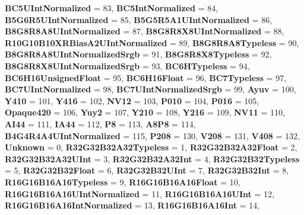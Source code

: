\begin{DoxyCompactItemize}
\newline
{\bfseries B\+C5\+U\+Int\+Normalized} = 83, 
{\bfseries B\+C5\+Int\+Normalized} = 84, 
{\bfseries B5\+G6\+R5\+U\+Int\+Normalized} = 85, 
{\bfseries B5\+G5\+R5\+A1\+U\+Int\+Normalized} = 86, 
\newline
{\bfseries B8\+G8\+R8\+A8\+U\+Int\+Normalized} = 87, 
{\bfseries B8\+G8\+R8\+X8\+U\+Int\+Normalized} = 88, 
{\bfseries R10\+G10\+B10\+X\+R\+Bias\+A2\+U\+Int\+Normalized} = 89, 
{\bfseries B8\+G8\+R8\+A8\+Typeless} = 90, 
\newline
{\bfseries B8\+G8\+R8\+A8\+U\+Int\+Normalized\+Srgb} = 91, 
{\bfseries B8\+G8\+R8\+X8\+Typeless} = 92, 
{\bfseries B8\+G8\+R8\+X8\+U\+Int\+Normalized\+Srgb} = 93, 
{\bfseries B\+C6\+H\+Typeless} = 94, 
\newline
{\bfseries B\+C6\+H16\+Unsigned\+Float} = 95, 
{\bfseries B\+C6\+H16\+Float} = 96, 
{\bfseries B\+C7\+Typeless} = 97, 
{\bfseries B\+C7\+U\+Int\+Normalized} = 98, 
\newline
{\bfseries B\+C7\+U\+Int\+Normalized\+Srgb} = 99, 
{\bfseries Ayuv} = 100, 
{\bfseries Y410} = 101, 
{\bfseries Y416} = 102, 
\newline
{\bfseries N\+V12} = 103, 
{\bfseries P010} = 104, 
{\bfseries P016} = 105, 
{\bfseries Opaque420} = 106, 
\newline
{\bfseries Yuy2} = 107, 
{\bfseries Y210} = 108, 
{\bfseries Y216} = 109, 
{\bfseries N\+V11} = 110, 
\newline
{\bfseries A\+I44} = 111, 
{\bfseries I\+A44} = 112, 
{\bfseries P8} = 113, 
{\bfseries A8\+P8} = 114, 
\newline
{\bfseries B4\+G4\+R4\+A4\+U\+Int\+Normalized} = 115, 
{\bfseries P208} = 130, 
{\bfseries V208} = 131, 
{\bfseries V408} = 132, 
\newline
{\bfseries Unknown} = 0, 
{\bfseries R32\+G32\+B32\+A32\+Typeless} = 1, 
{\bfseries R32\+G32\+B32\+A32\+Float} = 2, 
{\bfseries R32\+G32\+B32\+A32\+U\+Int} = 3, 
\newline
{\bfseries R32\+G32\+B32\+A32\+Int} = 4, 
{\bfseries R32\+G32\+B32\+Typeless} = 5, 
{\bfseries R32\+G32\+B32\+Float} = 6, 
{\bfseries R32\+G32\+B32\+U\+Int} = 7, 
\newline
{\bfseries R32\+G32\+B32\+Int} = 8, 
{\bfseries R16\+G16\+B16\+A16\+Typeless} = 9, 
{\bfseries R16\+G16\+B16\+A16\+Float} = 10, 
{\bfseries R16\+G16\+B16\+A16\+U\+Int\+Normalized} = 11, 
\newline
{\bfseries R16\+G16\+B16\+A16\+U\+Int} = 12, 
{\bfseries R16\+G16\+B16\+A16\+Int\+Normalized} = 13, 
{\bfseries R16\+G16\+B16\+A16\+Int} = 14, 

\end{DoxyCompactItemize}
